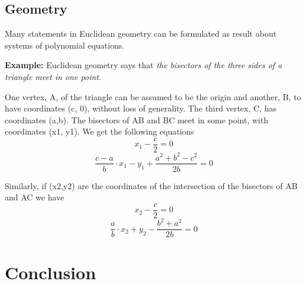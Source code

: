\documentclass[11pt]{article}
\begin{document}
\subsection{Geometry}
Many statements in Euclidean geometry can be formulated as result about systems of polynomial equations.\cite{richterArticle}

\textbf {Example:} Euclidean geometry says that \textit{the bisectors of the three sides of a triangle meet in one point.}

One vertex, A, of the triangle can be assumed to be the origin and another, B, to have coordinates (c, 0), without loss of generality. The third vertex, C, has coordinates (a,b).
The bisectors of AB and BC meet in some point, with coordinates (x1, y1). We get the following equations
\begin{equation}
    x_1- \frac {c}{2}=0
\end{equation}
\begin{equation}
    \frac {c-a}{b} \cdotp x_1 - y_1 + \frac {a^2 + b^2 - c^2}{2b} = 0
\end{equation}

Similarly, if (x2,y2) are the coordinates of the intersection of the bisectors of AB and AC we have
\begin{equation}
    x_2- \frac {c}{2}=0
\end{equation}
\begin{equation}
    \frac {a}{b} \cdotp x_2 + y_2 - \frac {b^2 + a^2}{2b} = 0
\end{equation}

\section{Conclusion}
\end{document}
